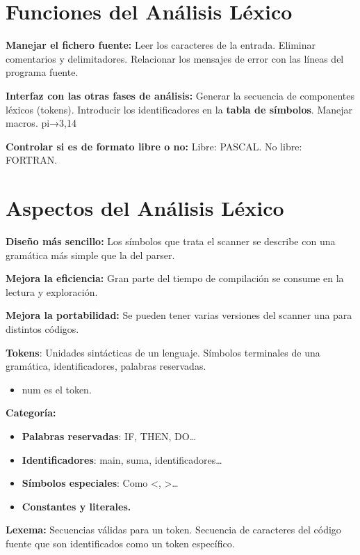 \documentclass[12pt]{report} %
\begin{document}
\section{Funciones del Análisis Léxico}

\textbf{Manejar el fichero fuente:} Leer los caracteres de la entrada.
Eliminar comentarios y delimitadores. Relacionar los mensajes de error
con las líneas del programa fuente.

\textbf{Interfaz con las otras fases de análisis:} Generar la secuencia
de componentes léxicos (tokens). Introducir los identificadores en la
\textbf{tabla de símbolos}. Manejar macros. pi→3,14

\textbf{Controlar si es de formato libre o no:} Libre: PASCAL. No libre:
FORTRAN.


\section{Aspectos del Análisis Léxico}

\textbf{Diseño más sencillo:} Los símbolos que trata el scanner se
describe con una gramática más simple que la del parser.

\textbf{Mejora la eficiencia:} Gran parte del tiempo de compilación se
consume en la lectura y exploración.

\textbf{Mejora la portabilidad:} Se pueden tener varias versiones del
scanner una para distintos códigos.

\textbf{Tokens}: Unidades sintácticas de un lenguaje. Símbolos
terminales de una gramática, identificadores, palabras reservadas.

\begin{itemize}

\item
  num es el token.
\end{itemize}

\textbf{Categoría:}

\begin{itemize}
\item
  \textbf{Palabras reservadas}: IF, THEN, DO\ldots{}
\item
  \textbf{Identificadores}: main, suma, identificadores\ldots{}
\item
  \textbf{Símbolos especiales}: Como \textless, \textgreater\ldots{}
\item
  \textbf{Constantes y literales.}
\end{itemize}

\textbf{Lexema:} Secuencias válidas para un token. Secuencia de
caracteres del código fuente que son identificados como un token
específico.
\end{document}
